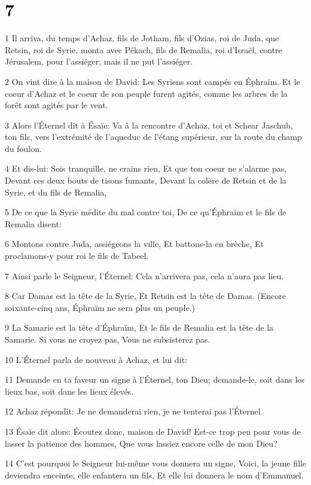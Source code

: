 \chapter{7}

\par 1 Il arriva, du temps d'Achaz, fils de Jotham, fils d'Ozias, roi de Juda, que Retsin, roi de Syrie, monta avec Pékach, fils de Remalia, roi d'Israël, contre Jérusalem, pour l'assiéger; mais il ne put l'assiéger.
\par 2 On vint dire à la maison de David: Les Syriens sont campés en Éphraïm. Et le coeur d'Achaz et le coeur de son peuple furent agités, comme les arbres de la forêt sont agités par le vent.
\par 3 Alors l'Éternel dit à Ésaïe: Va à la rencontre d'Achaz, toi et Schear Jaschub, ton fils, vers l'extrémité de l'aqueduc de l'étang supérieur, sur la route du champ du foulon.
\par 4 Et dis-lui: Sois tranquille, ne crains rien, Et que ton coeur ne s'alarme pas, Devant ces deux bouts de tisons fumants, Devant la colère de Retsin et de la Syrie, et du fils de Remalia,
\par 5 De ce que la Syrie médite du mal contre toi, De ce qu'Éphraïm et le fils de Remalia disent:
\par 6 Montons contre Juda, assiégeons la ville, Et battons-la en brèche, Et proclamons-y pour roi le fils de Tabeel.
\par 7 Ainsi parle le Seigneur, l'Éternel: Cela n'arrivera pas, cela n'aura pas lieu.
\par 8 Car Damas est la tête de la Syrie, Et Retsin est la tête de Damas. (Encore soixante-cinq ans, Éphraïm ne sera plus un peuple.)
\par 9 La Samarie est la tête d'Éphraïm, Et le fils de Remalia est la tête de la Samarie. Si vous ne croyez pas, Vous ne subsisterez pas.
\par 10 L'Éternel parla de nouveau à Achaz, et lui dit:
\par 11 Demande en ta faveur un signe à l'Éternel, ton Dieu; demande-le, soit dans les lieux bas, soit dans les lieux élevés.
\par 12 Achaz répondit: Je ne demanderai rien, je ne tenterai pas l'Éternel.
\par 13 Ésaïe dit alors: Écoutez donc, maison de David! Est-ce trop peu pour vous de lasser la patience des hommes, Que vous lassiez encore celle de mon Dieu?
\par 14 C'est pourquoi le Seigneur lui-même vous donnera un signe, Voici, la jeune fille deviendra enceinte, elle enfantera un fils, Et elle lui donnera le nom d'Emmanuel.
